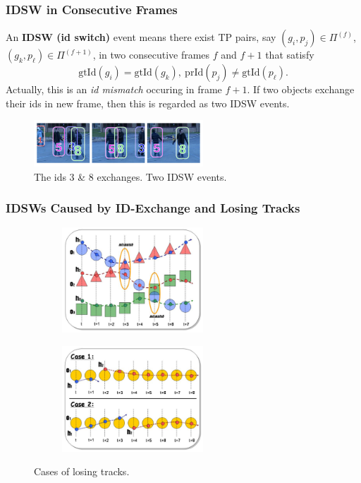 \documentclass[slidetop, mathserif]{beamer}
\begin{document}
\begin{frame}
	\frametitle{IDSW in Consecutive Frames}
			
	An {\bf IDSW (id switch)} event means there exist TP pairs, say $(g_i, p_j)\in\Pi^{(f)}$,
	$(g_k, p_\ell)\in\Pi^{(f+1)}$, in two consecutive frames
	$f$ and $f+1$ that satisfy
	\[
		\text{gtId}(g_i) = \text{gtId}(g_k),\ 
		\text{prId}(p_j) \neq \text{gtId}(p_\ell).
	\]
	Actually, this is an \emph{id mismatch} occuring in frame $f+1$.
	If two objects exchange their ids in new frame, then this is regarded as two
	IDSW events.
	\begin{figure}
		\includegraphics[width=180pt]{pics/fig3.png}
		\caption{The ids 3 \& 8 exchanges. Two IDSW events.}
	\end{figure}
			    
\end{frame}

\begin{frame}
	\frametitle{IDSWs Caused by ID-Exchange and Losing Tracks}

	\begin{figure}
		\begin{subfigure}{.49\textwidth}
			\includegraphics[width=150pt]{pics/fig16.png}
		\end{subfigure}
		\begin{subfigure}{.49\textwidth}
			\includegraphics[width=150pt]{pics/fig17.png}
		\end{subfigure}
		\caption{Cases of losing tracks.}
	\end{figure}
\end{frame}
\end{document}
